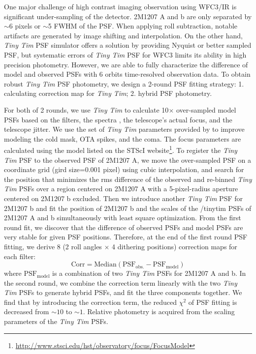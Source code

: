 \documentclass[apj]{emulateapj}
\newcommand{\tinytim}{\textit{Tiny Tim}}
\begin{document}
One major challenge of high contrast imaging observation using WFC3/IR
is significant under-sampling of the detector.  2M1207 A and b are
only separated by $\sim6$ pixels or $\sim$5 FWHM of the PSF. When
applying roll subtraction, notable artifacts are generated
by image shifting and interpolation. On the other hand, \tinytim{} PSF
simulator\citep{Krist1995} offers a solution by providing Nyquist or better
sampled PSF, but systematic errors of \tinytim{} PSF for WFC3 limits
its ability in high precision photometry\citep{Biretta2014}. However,
we are able to fully characterize the difference of model and observed
PSFs with 6 orbits time-resolved observation data. To obtain robust \tinytim{} PSF
photometry, we design a 2-round PSF fitting strategy: 1. calculating
correction map for \tinytim{}; 2. hybrid PSF photometry.

For both of 2 rounds, we use \tinytim{} to calculate 10$\times$
over-sampled model PSFs based on the filters, the spectra
\citep{Bonnefoy2014, Patience2010}, the telescope's actual focus, and
the telescope jitter.  We use the set of \tinytim{} parameters
provided by \cite{Biretta2014} to improve modeling  the cold mask, OTA
spikes, and the coma. The focus parameters are calculated using the
model listed on the STScI
website\footnote{\url{http://www.stsci.edu/hst/observatory/focus/FocusModel}}.
To register the \tinytim{} PSF to the observed PSF of 2M1207 A, we move the
over-sampled PSF on a coordinate grid (gird size=0.001 pixel) using
cubic interpolation, and search for the position that minimizes the
rms difference of the observed and re-binned \tinytim{} PSFs over a
region centered on 2M1207 A with a 5-pixel-radius aperture centered on
2M1207 b excluded.  Then we introduce another \tinytim{} PSF for
2M1207 b and fit the position of 2M1207 b and the scales of the
/tinytim{} PSFs of 
2M1207 A and b simultaneously with least square optimization. From the
first round fit, we discover that the difference of observed PSFs and model
PSFs are very stable for given PSF positions. Therefore, at the end
of the first round PSF fitting, we derive 8 (2 roll angles $\times$ 4
dithering positions)  correction maps for each
filter:
\begin{equation}
  \mathrm{Corr = Median(PSF_{obs.} - PSF_{model} )}
\end{equation}
where $\mathrm{PSF_{model}}$ is a combination of two \tinytim{} PSFs
for 2M1207 A and b. In the second round, we combine the correction
term linearly with the two \tinytim{} PSFs to generate hybrid PSFs,
and fit the three components together. We find that by introducing the correction term,
the reduced $\chi^{2}$ of PSF fitting is decreased from $\sim 10$ to
$\sim 1$. Relative photometry is acquired from the scaling
parameters of the \tinytim{} PSFs.
\end{document}
